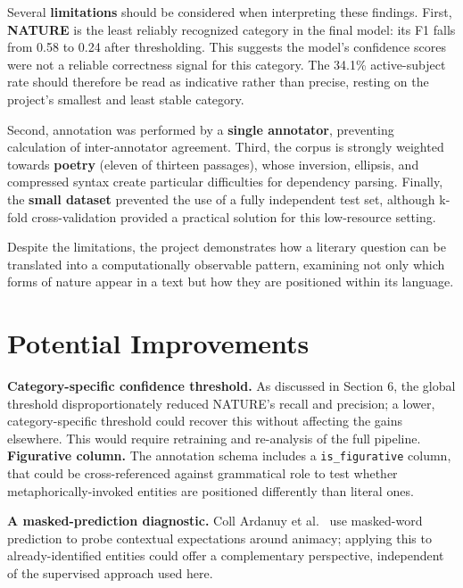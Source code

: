 \documentclass[11pt]{article}
\begin{document}
Several \textbf{limitations} should be considered when interpreting these findings. First, \textbf{NATURE} is the least reliably recognized category in the final model: its F1 falls from 0.58 to 0.24 after thresholding. This suggests the model’s confidence scores were not a reliable correctness signal for this category. The 34.1\% active-subject rate should therefore be read as indicative rather than precise, resting on the project’s smallest and least stable category.

Second, annotation was performed by a \textbf{single annotator}, preventing calculation of inter-annotator agreement. Third, the corpus is strongly weighted towards \textbf{poetry} (eleven of thirteen passages), whose inversion, ellipsis, and compressed syntax create particular difficulties for dependency parsing. Finally, the \textbf{small dataset} prevented the use of a fully independent test set, although k-fold cross-validation provided a practical solution for this low-resource setting.

Despite the limitations, the project demonstrates how a literary question can be translated into a computationally observable pattern, examining not only which forms of nature appear in a text but how they are positioned within its language.

\section{Potential Improvements}
\textbf{Category-specific confidence threshold.} As discussed in Section 6, the global threshold disproportionately reduced NATURE’s recall and precision; a lower, category-specific threshold could recover this without affecting the gains elsewhere. This would require retraining and re-analysis of the full pipeline. \\

\textbf{Figurative column.} The annotation schema includes a \texttt{is\_figurative} column, that could be cross-referenced against grammatical role to test whether metaphorically-invoked entities are positioned differently than literal ones.

\textbf{A masked-prediction diagnostic.} Coll Ardanuy et al.~ use masked-word prediction to probe contextual expectations around animacy; applying this to already-identified entities could offer a complementary perspective, independent of the supervised approach used here.

\newpage
\onecolumn
\end{document}
